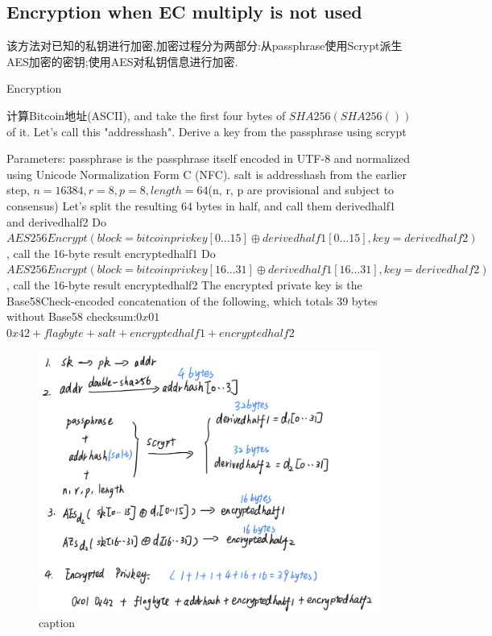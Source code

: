 \subsection{Encryption when EC multiply is not used}

该方法对已知的私钥进行加密,加密过程分为两部分:从passphrase使用Scrypt派生AES加密的密钥;使用AES对私钥信息进行加密.

\begin{algorithm}[tbp]\footnotesize
\caption{Encryption}\label{encryption without ec multiply}
  	\begin{algorithmic}[1]
	    \STATE 计算Bitcoin地址(ASCII), and take the first four bytes of $SHA256(SHA256())$ of it. Let's call this "addresshash".
		\STATE Derive a key from the passphrase using scrypt  
		
		\STATE Parameters: passphrase is the passphrase itself encoded in UTF-8 and normalized using Unicode Normalization Form C (NFC). salt is addresshash from the earlier step, $n=16384, r=8, p=8, length=64 $(n, r, p are provisional and subject to consensus)  
		\STATE Let's split the resulting 64 bytes in half, and call them derivedhalf1 and derivedhalf2
		\STATE Do $AES256Encrypt(block = bitcoinprivkey[0...15] \oplus derivedhalf1[0...15], key = derivedhalf2)$, call the 16-byte result encryptedhalf1  
		\STATE Do $AES256Encrypt(block = bitcoinprivkey[16...31] \oplus derivedhalf1[16...31], key = derivedhalf2)$, call the 16-byte result encryptedhalf2 
		\STATE The encrypted private key is the Base58Check-encoded concatenation of the following, which totals 39 bytes without Base58 checksum:$0x01$ $0x42 + flagbyte + salt + encryptedhalf1 + encryptedhalf2$
    \end{algorithmic}
\end{algorithm}

\begin{figure}[h]
\centering
\includegraphics[width=.7\textwidth]{./no-ec.png}
\caption{caption}\label{fig-parsesig}
\end{figure}

